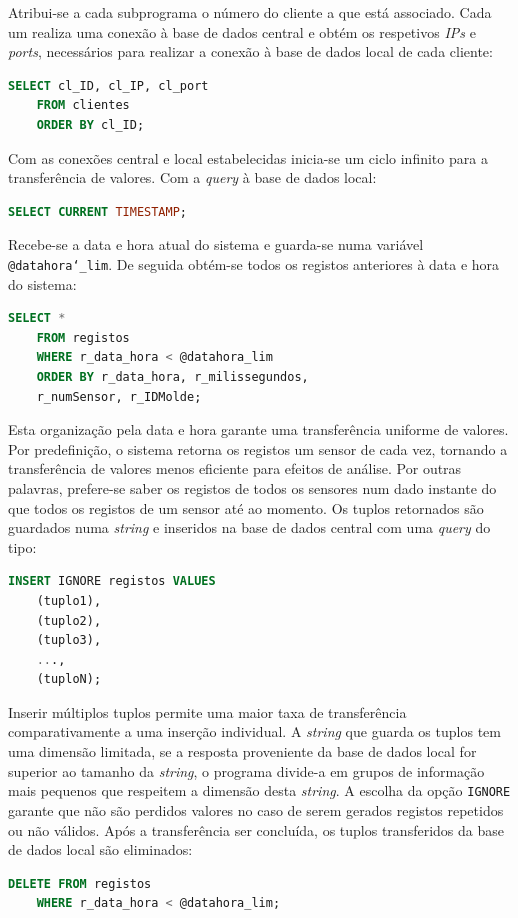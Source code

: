 \documentclass[11pt,twoside,a4paper]{report}
\begin{document}
Atribui-se a cada subprograma o número do cliente a que está associado. Cada um realiza uma conexão à base de dados central e obtém os respetivos \textit{IPs} e \textit{ports}, necessários para realizar a conexão à base de dados local de cada cliente:
\begin{lstlisting}[language = SQL]
	SELECT cl_ID, cl_IP, cl_port
	FROM clientes
	ORDER BY cl_ID;
\end{lstlisting}
Com as conexões central e local estabelecidas inicia-se um ciclo infinito para a transferência de valores. Com a \textit{query} à base de dados local:
\begin{lstlisting}[language = SQL]
	SELECT CURRENT TIMESTAMP;
\end{lstlisting}
Recebe-se a data e hora atual do sistema e guarda-se numa variável \texttt{@datahora\char`_lim}. De seguida obtém-se todos os registos anteriores à data e hora do sistema:
\begin{lstlisting}[language = SQL]
	SELECT *
	FROM registos
	WHERE r_data_hora < @datahora_lim
	ORDER BY r_data_hora, r_milissegundos,
	r_numSensor, r_IDMolde;
\end{lstlisting}
Esta organização pela data e hora garante uma transferência uniforme de valores. Por predefinição, o sistema retorna os registos um sensor de cada vez, tornando a transferência de valores menos eficiente para efeitos de análise. Por outras palavras, prefere-se saber os registos de todos os sensores num dado instante do que todos os registos de um sensor até ao momento. Os tuplos retornados são guardados numa \textit{string} e inseridos na base de dados central com uma \textit{query} do tipo:
\begin{lstlisting}[language = SQL]
	INSERT IGNORE registos VALUES
	(tuplo1),
	(tuplo2),
	(tuplo3),
	...,
	(tuploN);
\end{lstlisting}
Inserir múltiplos tuplos permite uma maior taxa de transferência comparativamente a uma inserção individual. A \textit{string} que guarda os tuplos tem uma dimensão limitada, se a resposta proveniente da base de dados local for superior ao tamanho da \textit{string}, o programa divide-a em grupos de informação mais pequenos que respeitem a dimensão desta \textit{string}. A escolha da opção \texttt{IGNORE} garante que não são perdidos valores no caso de serem gerados registos repetidos ou não válidos. Após a transferência ser concluída, os tuplos transferidos da base de dados local são eliminados:
\begin{lstlisting}[language = SQL]
	DELETE FROM registos
	WHERE r_data_hora < @datahora_lim;
\end{lstlisting}
\end{document}

